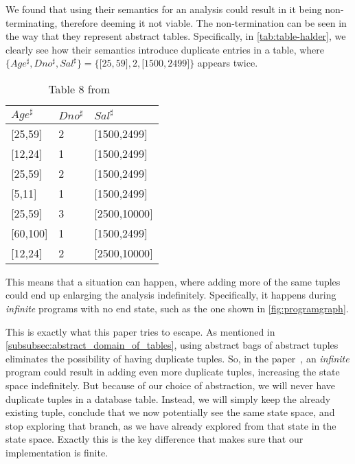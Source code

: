 We found that using their semantics for an analysis could result in it being non-terminating,
therefore deeming it not viable.
The non-termination can be seen in the way that they represent abstract tables.
Specifically, in \autoref{tab:table-halder},
we clearly see how their semantics introduce duplicate entries in a table, where $\{Age^\sharp,Dno^\sharp,Sal^\sharp\}=\{{[}25,59{]},2,{[}1500,2499{]}\}$ appears twice.


\begin{table}
    \centering
    \caption{Table 8 from~\cite{halder_abstract_2012}}
    \begin{tabular}{lll}
        \toprule
        $Age^\sharp$ & $Dno^\sharp$ & $Sal^\sharp$ \\ \midrule
        {[}25,59{]}             & 2                       & {[}1500,2499{]}         \\
        {[}12,24{]}             & 1                       & {[}1500,2499{]}         \\
        {[}25,59{]}             & 2                       & {[}1500,2499{]}         \\
        {[}5,11{]}              & 1                       & {[}1500,2499{]}         \\
        {[}25,59{]}             & 3                       & {[}2500,10000{]}        \\
        {[}60,100{]}            & 1                       & {[}1500,2499{]}         \\
        {[}12,24{]}             & 2                       & {[}2500,10000{]}        \\ \bottomrule
    \end{tabular}\label{tab:table-halder}
\end{table}


This means that a situation can happen, where adding more of the same tuples could end up enlarging the analysis indefinitely.
Specifically, it happens during \textit{infinite} programs with no end state, such as the one shown in \autoref{fig:programgraph}.


This is exactly what this paper tries to escape.
As mentioned in \autoref{subsubsec:abstract_domain_of_tables}, using abstract bags of abstract tuples eliminates the possibility of having duplicate tuples.
So, in the paper~\cite{halder_abstract_2012}, an \textit{infinite} program could result in adding even more duplicate tuples, increasing the state space indefinitely.
But because of our choice of abstraction, we will never have duplicate tuples in a database table.
Instead, we will simply keep the already existing tuple, conclude that we now potentially see the same state space, and stop exploring that branch, as we have already explored from that state in the state space.
Exactly this is the key difference that makes sure that our implementation is finite.

